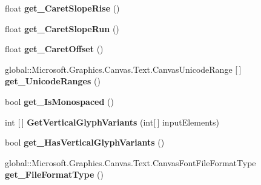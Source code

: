 \begin{DoxyCompactItemize}
float {\bfseries get\+\_\+\+Caret\+Slope\+Rise} ()
\item 
\mbox{\label{class_microsoft_1_1_graphics_1_1_canvas_1_1_text_1_1_canvas_font_face_a878777759b5123bc01294e5fbdbab407}} 
float {\bfseries get\+\_\+\+Caret\+Slope\+Run} ()
\item 
\mbox{\label{class_microsoft_1_1_graphics_1_1_canvas_1_1_text_1_1_canvas_font_face_aef2a7da4f559f170e4ed1e88833978f3}} 
float {\bfseries get\+\_\+\+Caret\+Offset} ()
\item 
\mbox{\label{class_microsoft_1_1_graphics_1_1_canvas_1_1_text_1_1_canvas_font_face_a89c237506d19a835c79cf7207a7d9c74}} 
global\+::\+Microsoft.\+Graphics.\+Canvas.\+Text.\+Canvas\+Unicode\+Range \mbox{[}$\,$\mbox{]} {\bfseries get\+\_\+\+Unicode\+Ranges} ()
\item 
\mbox{\label{class_microsoft_1_1_graphics_1_1_canvas_1_1_text_1_1_canvas_font_face_a1e7f8ef95512544e321b82841e0ab692}} 
bool {\bfseries get\+\_\+\+Is\+Monospaced} ()
\item 
\mbox{\label{class_microsoft_1_1_graphics_1_1_canvas_1_1_text_1_1_canvas_font_face_adb8b1652276da4c6f72b3890a611a3e6}} 
int \mbox{[}$\,$\mbox{]} {\bfseries Get\+Vertical\+Glyph\+Variants} (int\mbox{[}$\,$\mbox{]} input\+Elements)
\item 
\mbox{\label{class_microsoft_1_1_graphics_1_1_canvas_1_1_text_1_1_canvas_font_face_a8e1d6d1039882948a5a305512eb2ec10}} 
bool {\bfseries get\+\_\+\+Has\+Vertical\+Glyph\+Variants} ()
\item 
\mbox{\label{class_microsoft_1_1_graphics_1_1_canvas_1_1_text_1_1_canvas_font_face_aeab8855a726a610ea0ae9ece8c7eec26}} 
global\+::\+Microsoft.\+Graphics.\+Canvas.\+Text.\+Canvas\+Font\+File\+Format\+Type {\bfseries get\+\_\+\+File\+Format\+Type} ()

\end{DoxyCompactItemize}
